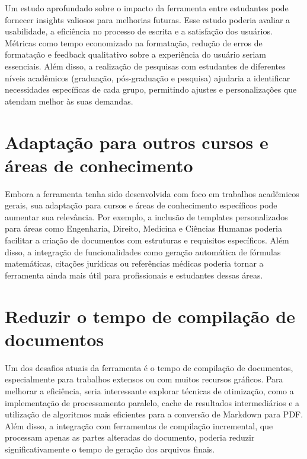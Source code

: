 \documentclass[
	12pt,				%
	oneside,			%
	a4paper,			%
	english,			%
	french,				%
	spanish,			%
	brazil				%
	]{abntex2}
\begin{document}
Um estudo aprofundado sobre o impacto da ferramenta entre estudantes
pode fornecer insights valiosos para melhorias futuras. Esse estudo
poderia avaliar a usabilidade, a eficiência no processo de escrita e a
satisfação dos usuários. Métricas como tempo economizado na formatação,
redução de erros de formatação e feedback qualitativo sobre a
experiência do usuário seriam essenciais. Além disso, a realização de
pesquisas com estudantes de diferentes níveis acadêmicos (graduação,
pós-graduação e pesquisa) ajudaria a identificar necessidades
específicas de cada grupo, permitindo ajustes e personalizações que
atendam melhor às suas demandas.

\hypertarget{adaptauxe7uxe3o-para-outros-cursos-e-uxe1reas-de-conhecimento}{%
\section{Adaptação para outros cursos e áreas de
conhecimento}\label{adaptauxe7uxe3o-para-outros-cursos-e-uxe1reas-de-conhecimento}}

Embora a ferramenta tenha sido desenvolvida com foco em trabalhos
acadêmicos gerais, sua adaptação para cursos e áreas de conhecimento
específicos pode aumentar sua relevância. Por exemplo, a inclusão de
templates personalizados para áreas como Engenharia, Direito, Medicina e
Ciências Humanas poderia facilitar a criação de documentos com
estruturas e requisitos específicos. Além disso, a integração de
funcionalidades como geração automática de fórmulas matemáticas,
citações jurídicas ou referências médicas poderia tornar a ferramenta
ainda mais útil para profissionais e estudantes dessas áreas.

\hypertarget{reduzir-o-tempo-de-compilauxe7uxe3o-de-documentos}{%
\section{Reduzir o tempo de compilação de
documentos}\label{reduzir-o-tempo-de-compilauxe7uxe3o-de-documentos}}

Um dos desafios atuais da ferramenta é o tempo de compilação de
documentos, especialmente para trabalhos extensos ou com muitos recursos
gráficos. Para melhorar a eficiência, seria interessante explorar
técnicas de otimização, como a implementação de processamento paralelo,
cache de resultados intermediários e a utilização de algoritmos mais
eficientes para a conversão de Markdown para PDF. Além disso, a
integração com ferramentas de compilação incremental, que processam
apenas as partes alteradas do documento, poderia reduzir
significativamente o tempo de geração dos arquivos finais.
\end{document}
